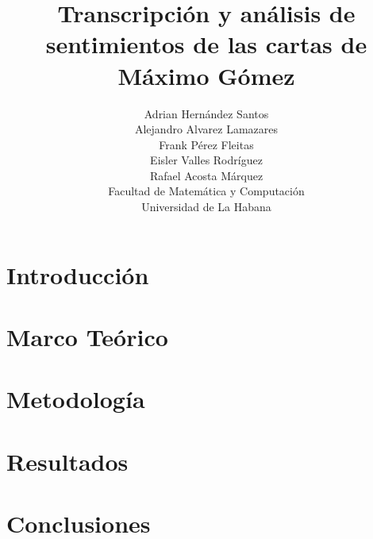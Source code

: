 \documentclass[11pt,a4paper]{article}
\title{Transcripción y análisis de sentimientos de las cartas de Máximo Gómez}
\author{
    Adrian Hernández Santos\\
    Alejandro Alvarez Lamazares\\
    Frank Pérez Fleitas\\
    Eisler Valles Rodríguez\\
    \vspace{5cm}
    Rafael Acosta Márquez\\
    \small{Facultad de Matemática y Computación}\\
    \small{Universidad de La Habana}
}
\begin{document}
\maketitle

\newpage

\begin{abstract}
\end{abstract}

\section{Introducción}

\section{Marco Teórico}

\section{Metodología}

\section{Resultados}

\section{Conclusiones}



\end{document}
